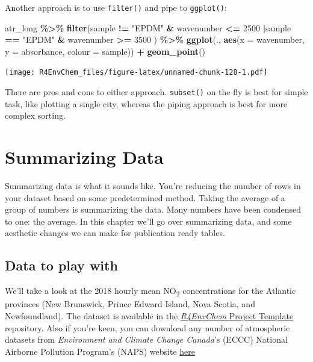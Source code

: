 \documentclass[
]{book}
\newenvironment{Shaded}{\begin{snugshade}}{\end{snugshade}}
\newcommand{\AttributeTok}[1]{\textcolor[rgb]{0.13,0.29,0.53}{#1}}
\newcommand{\DecValTok}[1]{\textcolor[rgb]{0.00,0.00,0.81}{#1}}
\newcommand{\FunctionTok}[1]{\textcolor[rgb]{0.13,0.29,0.53}{\textbf{#1}}}
\newcommand{\NormalTok}[1]{#1}
\newcommand{\SpecialCharTok}[1]{\textcolor[rgb]{0.81,0.36,0.00}{\textbf{#1}}}
\newcommand{\StringTok}[1]{\textcolor[rgb]{0.31,0.60,0.02}{#1}}
\begin{document}
Another approach is to use \texttt{filter()} and pipe to \texttt{ggplot()}:

\begin{Shaded}
\begin{Highlighting}[]
\NormalTok{atr\_long }\SpecialCharTok{\%\textgreater{}\%}
  \FunctionTok{filter}\NormalTok{(sample }\SpecialCharTok{!=} \StringTok{"EPDM"} \SpecialCharTok{\&}\NormalTok{ wavenumber }\SpecialCharTok{\textless{}=} \DecValTok{2500} \SpecialCharTok{|}\NormalTok{sample }\SpecialCharTok{==} \StringTok{"EPDM"} \SpecialCharTok{\&}\NormalTok{ wavenumber }\SpecialCharTok{\textgreater{}=} \DecValTok{3500}\NormalTok{ ) }\SpecialCharTok{\%\textgreater{}\%}
  \FunctionTok{ggplot}\NormalTok{(., }\FunctionTok{aes}\NormalTok{(}\AttributeTok{x =}\NormalTok{ wavenumber, }\AttributeTok{y =}\NormalTok{ absorbance, }\AttributeTok{colour =}\NormalTok{ sample)) }\SpecialCharTok{+}
  \FunctionTok{geom\_point}\NormalTok{()}
\end{Highlighting}
\end{Shaded}

\texttt{[image: R4EnvChem\_files/figure-latex/unnamed-chunk-128-1.pdf]}

There are pros and cons to either approach. \texttt{subset()} on the fly is best for simple task, like plotting a single city, whereas the piping approach is best for more complex sorting.

\hypertarget{summarizing-data}{%
\chapter{Summarizing Data}\label{summarizing-data}}

Summarizing data is what it sounds like. You're reducing the number of rows in your dataset based on some predetermined method. Taking the average of a group of numbers is summarizing the data. Many numbers have been condensed to one: the average. In this chapter we'll go over summarizing data, and some aesthetic changes we can make for publication ready tables.

\hypertarget{data-to-play-with}{%
\section{Data to play with}\label{data-to-play-with}}

We'll take a look at the 2018 hourly mean NO\textsubscript{2} concentrations for the Atlantic provinces (New Brunswick, Prince Edward Island, Nova Scotia, and Newfoundland). The dataset is available in the \href{https://github.com/DavidRossHall/R4EnvChem-ProjectTemplate}{\emph{R4EnvChem} Project Template} repository. Also if you're keen, you can download any number of atmospheric datasets from \emph{Environment and Climate Change Canada}'s (ECCC) National Airborne Pollution Program's (NAPS) website \href{https://data.ec.gc.ca/data/air/monitor/national-air-pollution-surveillance-naps-program/Data-Donnees/?lang=en}{here}
\end{document}
